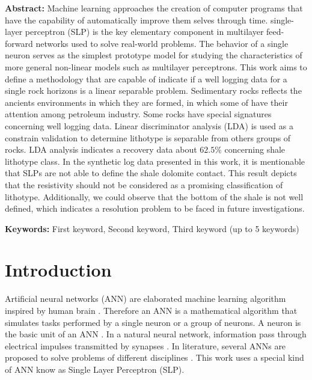 \documentclass{cilamce19}
\begin{document}
\begin{titlepage}
\noindent %
\textbf{Abstract:}   Machine learning approaches the creation of computer programs that have the capability of automatically improve them selves through time. single-layer perceptron (SLP) is the key elementary component in multilayer feed-forward networks used to solve real-world problems. The behavior of a single neuron serves as the simplest prototype model for studying the characteristics of more general non-linear models such as multilayer perceptrons. This work aims to define a methodology that are capable of indicate if a well logging data for a single rock horizons is a linear separable problem. Sedimentary rocks reflects the ancients environments in which they are formed, in which some of have their attention among petroleum industry. Some rocks have special signatures concerning well logging data. Linear discriminator analysis (LDA) is used as a constrain  validation to determine lithotype is separable from others groups of rocks. LDA analysis indicates a recovery data about $62.5\%$ concerning shale lithotype class. In the synthetic log data presented in this work, it is mentionable that SLPs are not able to define the shale dolomite contact. This result depicts that the resistivity should not be considered as a promising classification of lithotype. Additionally, we could observe that the bottom of the shale is not well defined, which indicates a resolution problem to be faced in future investigations.

\noindent %
\textbf{Keywords:} First keyword, Second keyword, Third keyword (up to 5 keywords) 

\end{titlepage}




\section{Introduction}
   Artificial neural networks (ANN) are elaborated machine learning algorithm inspired by human brain \citet{Hagan1996}. Therefore an ANN is a mathematical algorithm that simulates tasks performed by a single neuron or a group of neurons. A neuron is the basic unit of an ANN \citet{Nedjah2016}. In a natural neural network, information pass through electrical impulses transmitted by synapses \citet{Krogh2008}.  In literature, several ANNs are proposed to solve problems of different disciplines \citet{Al-Anazi2010,Bruyelle2014,Adibifard2014,Kumar2015}. This work uses a special kind of ANN know as Single Layer Perceptron (SLP). 
   
\end{document}

